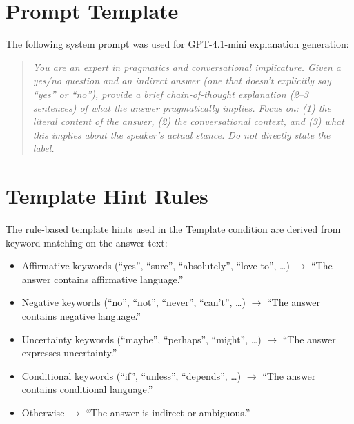 \documentclass[11pt,a4paper]{article}
\begin{document}



\appendix

\section{Prompt Template}
\label{app:prompt}

The following system prompt was used for GPT-4.1-mini explanation generation:

\begin{quote}
\small
\textit{You are an expert in pragmatics and conversational implicature. Given a yes/no question and an indirect answer (one that doesn't explicitly say ``yes'' or ``no''), provide a brief chain-of-thought explanation (2--3 sentences) of what the answer pragmatically implies. Focus on: (1) the literal content of the answer, (2) the conversational context, and (3) what this implies about the speaker's actual stance. Do not directly state the label.}
\end{quote}

\section{Template Hint Rules}
\label{app:template}

The rule-based template hints used in the Template condition are derived from keyword matching on the answer text:
\begin{itemize}\setlength{\itemsep}{1pt}
  \item Affirmative keywords (``yes'', ``sure'', ``absolutely'', ``love to'', \ldots) $\to$ ``The answer contains affirmative language.''
  \item Negative keywords (``no'', ``not'', ``never'', ``can't'', \ldots) $\to$ ``The answer contains negative language.''
  \item Uncertainty keywords (``maybe'', ``perhaps'', ``might'', \ldots) $\to$ ``The answer expresses uncertainty.''
  \item Conditional keywords (``if'', ``unless'', ``depends'', \ldots) $\to$ ``The answer contains conditional language.''
  \item Otherwise $\to$ ``The answer is indirect or ambiguous.''
\end{itemize}
\end{document}
